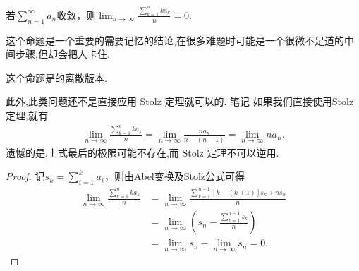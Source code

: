 \documentclass[../../main.tex]{subfiles}
\begin{document}
\begin{proposition}\label{proposition:级数收敛平均级数必收敛}
若$\sum_{n=1}^{\infty}a_n$收敛，则$\lim_{n\rightarrow \infty}\frac{\sum\limits_{k=1}^n{ka_k}}{n}=0$.
\end{proposition}
\begin{note}
这个命题是一个重要的需要记忆的结论,在很多难题时可能是一个很微不足道的中间步骤,但却会把人卡住.

这个命题是的离散版本.
\end{note}
\begin{remark}
此外,此类问题还不是直接应用 Stolz 定理就可以的.
笔记 如果我们直接使用Stolz 定理,就有
\begin{align*}
\lim_{n \to \infty} \frac{\sum\limits_{k=1}^n k a_k}{n} = \lim_{n \to \infty} \frac{n a_n}{n - (n - 1)} = \lim_{n \to \infty} n a_n.
\end{align*}
遗憾的是,上式最后的极限可能不存在,而 Stolz 定理不可以逆用.
\end{remark}
\begin{proof}
记$s_k=\sum_{i=1}^k{a_i}$，则由\hyperref[theorem:Abel变换]{Abel变换}及Stolz公式可得
\begin{align*}
\lim_{n\rightarrow \infty}\frac{\sum\limits_{k=1}^n{ka_k}}{n}&=\lim_{n\rightarrow \infty}\frac{\sum\limits_{k=1}^{n-1}\left[ k-\left( k+1 \right) \right] s_k+ns_n}{n}\\
&=\lim_{n\rightarrow \infty}\left( s_n-\frac{\sum\limits_{k=1}^{n-1}s_k}{n} \right)\\
&=\lim_{n\rightarrow \infty}s_n-\lim_{n\rightarrow \infty}s_n=0.
\end{align*}

\end{proof}
\end{document}
